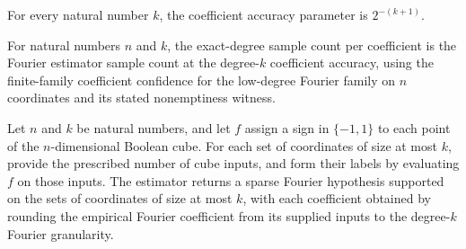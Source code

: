 \begin{theorem}
\label{FABL.degreeFourierCoefficientAccuracy_value}
\leanok
{}
For every natural number $k$, the coefficient accuracy parameter is $2^{-(k+1)}$.
\end{theorem}

\begin{definition}
\label{FABL.exactDegreeSamplesPerCoefficient}
\leanok
{}
For natural numbers $n$ and $k$, the exact-degree sample count per coefficient is the
Fourier estimator sample count at the degree-$k$ coefficient accuracy, using the
finite-family coefficient confidence for the low-degree Fourier family on $n$
coordinates and its stated nonemptiness witness.
\end{definition}

\begin{definition}
\label{FABL.exactDegreeFourierEstimatorOutput}
\leanok
{}
Let $n$ and $k$ be natural numbers, and let $f$ assign a sign in $\{-1,1\}$ to each
point of the $n$-dimensional Boolean cube. For each set of coordinates of size at most
$k$, provide the prescribed number of cube inputs, and form their labels by evaluating
$f$ on those inputs. The estimator returns a sparse Fourier hypothesis supported on the
sets of coordinates of size at most $k$, with each coefficient obtained by rounding the
empirical Fourier coefficient from its supplied inputs to the degree-$k$ Fourier
granularity.
\end{definition}

